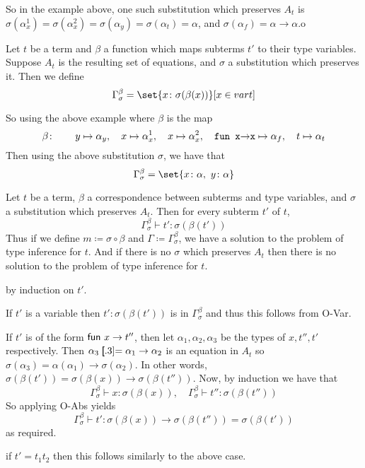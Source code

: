 \edefn

So in the example above, one such substitution which preserves $A_t$ is $\sigma(\alpha_x^1)=\sigma(\alpha_x^2)=\sigma(\alpha_y)=\sigma(\alpha_t)=\alpha$, and $\sigma(\alpha_f)=\alpha\to\alpha$.o

\bdefn

    Let $t$ be a term and $\beta$ a function which maps subterms $t'$ to their type variables.
    Suppose $A_t$ is the resulting set of equations, and $\sigma$ a substitution which preserves it.
    Then we define
    $$ \Gamma^\beta_\sigma = \set{x\colon\sigma(\beta(x))}[x\in\var t] $$

\edefn

So using the above example where $\beta$ is the map
$$ \beta\colon\qquad y\mapsto\alpha_y,\quad x\mapsto\alpha_x^1,\quad x\mapsto\alpha_x^2,\quad \lcalc{fun x\to x}\mapsto\alpha_f,\quad t\mapsto\alpha_t $$
Then using the above substitution $\sigma$, we have that
$$ \Gamma^\beta_\sigma = \set{x\colon\alpha,\ y\colon\alpha} $$

\bthrm

    Let $t$ be a term, $\beta$ a correspondence between subterms and type variables, and $\sigma$ a substitution which preserves $A_t$.
    Then for every subterm $t'$ of $t$,
    $$ \Gamma^\beta_\sigma\vdash t'\colon\sigma(\beta(t')) $$
    Thus if we define $m\coloneqq\sigma\circ\beta$ and $\Gamma\coloneqq\Gamma^\beta_\sigma$, we have a solution to the problem of type inference for $t$.
    And if there is no $\sigma$ which preserves $A_t$ then there is no solution to the problem of type inference for $t$.

\ethrm

\Proof by induction on $t'$.
\benum
    \item If $t'$ is a variable then $t'\colon\sigma(\beta(t'))$ is in $\Gamma^\beta_\sigma$ and thus this follows from {\tensc O-Var}.
    \item If $t'$ is of the form $\fun x\to t''$, then let $\alpha_1,\alpha_2,\alpha_3$ be the types of $x,t'',t'$ respectively.
    Then $\alpha_3\eq\alpha_1\to\alpha_2$ is an equation in $A_t$ so $\sigma(\alpha_3)=\alpha(\alpha_1)\to\sigma(\alpha_2)$.
    In other words, $\sigma(\beta(t'))=\sigma(\beta(x))\to\sigma(\beta(t''))$.
    Now, by induction we have that
    $$ \Gamma^\beta_\sigma\vdash x\colon\sigma(\beta(x)),\quad \Gamma^\beta_\sigma\vdash t''\colon\sigma(\beta(t'')) $$
    So applying {\tensc O-Abs} yields
    $$ \Gamma^\beta_\sigma\vdash t'\colon\sigma(\beta(x))\to\sigma(\beta(t'')) = \sigma(\beta(t')) $$
    as required.
    \item if $t'=t_1t_2$ then this follows similarly to the above case.
\eenum

